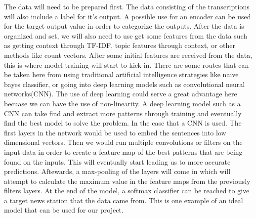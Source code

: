 The data will need to be prepared first. The data consisting of the transcriptions will also include a label for it's output. A possible use for an encoder can be used for the target output value in order to categorize the outputs. After the data is organized and set, we will also need to use get some features from the data such as getting context through TF-IDF, topic features through context, or other methods like count vectors. After some initial features are received from the data, this is where model training will start to kick in. There are some routes that can be taken here from using traditional artificial intelligence strategies like naive bayes classifier, or going into deep learning models such as convolutional neural networks(CNN). The use of deep learning could serve a great advantage here becuase we can have the use of non-linearity. A deep learning model such as a CNN can take find and extract more patterns through training and eventually find the best model to solve the problem. In the case that a CNN is used. The first layers in the network would be used to embed the sentences into low dimensional vectors. Then we would run multiple convolutions or filters on the input data in order to create a feature map of the best patterns that are being found on the inputs. This will eventually start leading us to more accurate predictions. Aftewards, a max-pooling of the layers will come in which will attempt to calculate the maximum value in the feature maps from the previously filters layers. At the end of the model, a softmax classifier can be reached to give a target news station that the data came from. This is one example of an ideal model that can be used for our project. 
